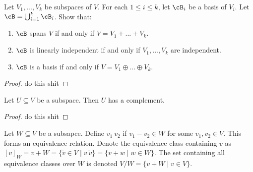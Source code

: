     \begin{exercise}
        Let $V_1,...,V_k$ be subspaces of $V$. For each $1\leq i \leq k$, let $\cB_i$ be a basis of $V_i$. Let $\cB = \bigcup_{i = 1}^k \cB_i$. Show that:
            \begin{enumerate}[label = (\arabic*)]
                \item $\cB$ spans $V$ if and only if $V = V_1 + ... + V_k$.
                \item $\cB$ is linearly independent if and only if $V_1,...,V_k$ are independent.
                \item $\cB$ is a basis if and only if $V = V_1 \oplus ... \oplus V_k$.
            \end{enumerate}
    \end{exercise}
        \begin{proof}
            \color{red} do this shit
        \end{proof}

    \begin{lemma}
        Let $U \subseteq V$ be a subspace. Then $U$ has a complement.
    \end{lemma}
        \begin{proof}
            \color{red} do this shit
        \end{proof}

    \begin{definition}
        Let $W \subseteq V$ be a subsapce. Define $v_1 ~ v_2$ if $v_1 - v_2 \in W$ for some $v_1,v_2 \in V$. This forms an equivalence relation. Denote the equivalence class containing $v$ as $[v]_W = v + W = \{\tilde{v} \in V \mid v ~ \tilde{v}\} = \{v+w \mid w \in W\}$. The set containing all equivalence classes over $W$ is denoted $V/W = \{v + W \mid v \in V\}$.
    \end{definition}

